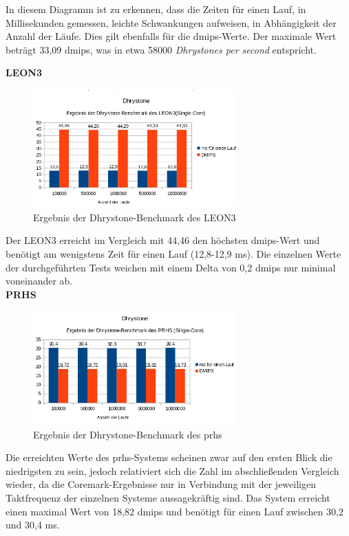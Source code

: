 In diesem Diagramm ist zu erkennen, dass die Zeiten für einen Lauf, in Millisekunden gemessen, leichte Schwankungen aufweisen, in Abhängigkeit der Anzahl der Läufe. Dies gilt ebenfalls für
die \ac{dmips}-Werte. Der maximale Wert beträgt 33,09 \ac{dmips}, was in etwa 58000 \emph{Dhrystones per second} entspricht.

\textbf{LEON3}

\begin{figure}[H]
\centering
\includegraphics[width=0.7\textwidth]{Hauptteil/dhrystonesingleleon3.png}
\caption{Ergebnis der Dhrystone-Benchmark des LEON3}
\label{fig:dhrystonesingleleon3}
\end{figure}

Der LEON3 erreicht im Vergleich mit 44,46 den höchsten \ac{dmips}-Wert und benötigt am wenigstens Zeit für einen Lauf (12,8-12,9 ms). Die einzelnen Werte der durchgeführten Tests weichen mit
einem Delta von 0,2 \ac{dmips} nur minimal voneinander ab.\\

\textbf{PRHS}

\begin{figure}[H]
\centering
\includegraphics[width=0.7\textwidth]{Hauptteil/dhrystonesingleprhs.png}
\caption{Ergebnis der Dhrystone-Benchmark des \ac{prhs}}
\label{fig:dhrystonesingleprhs}
\end{figure}

Die erreichten Werte des \ac{prhs}-Systems scheinen zwar auf den ersten Blick die niedrigsten zu sein, jedoch relativiert sich die Zahl im abschließenden Vergleich wieder, da die
Coremark-Ergebnisse nur in Verbindung mit der jeweiligen Taktfrequenz der einzelnen Systeme aussagekräftig sind. Das System erreicht einen maximal Wert von
18,82 \ac{dmips} und benötigt für einen Lauf zwischen 30,2 und 30,4 ms.\\

